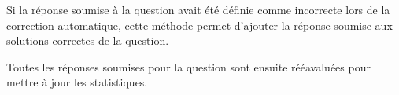 \documentclass[a4paper,11pt,openany,oneside]{sphinxmanual}
\begin{document}
\begin{fulllineitems}
\begin{fulllineitems}
\end{fulllineitems}


\begin{fulllineitems}
\label{database:quiz.models.SqSubmit.set_as_correct}
Si la réponse soumise à la question avait été définie comme incorrecte
lors de la correction automatique, cette méthode permet d'ajouter la réponse
soumise aux solutions correctes de la question.

Toutes les réponses soumises pour la question sont ensuite rééavaluées pour
mettre à jour les statistiques.

\end{fulllineitems}


\end{fulllineitems}

\end{document}
